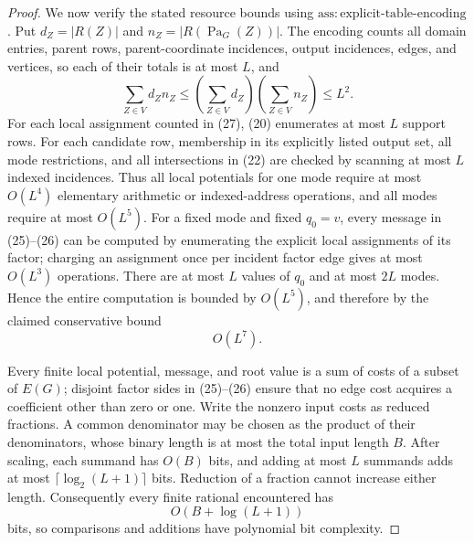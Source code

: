 \documentclass{article}
\begin{document}
\begin{proof}
We now verify the stated resource bounds using \(\mathrm{ass:explicit\mbox{-}table\mbox{-}encoding}\).  Put \(d_Z=|R(Z)|\) and \(n_Z=|R(\operatorname{Pa}_G(Z))|\).  The encoding counts all domain entries, parent rows, parent-coordinate incidences, output incidences, edges, and vertices, so each of their totals is at most \(L\), and
\[
 \sum_{Z\in V}d_Zn_Z
 \le \left(\sum_{Z\in V}d_Z\right)
      \left(\sum_{Z\in V}n_Z\right)
 \le L^2.                                                             \tag{27}
\]
For each local assignment counted in (27), (20) enumerates at most \(L\) support rows.  For each candidate row, membership in its explicitly listed output set, all mode restrictions, and all intersections in (22) are checked by scanning at most \(L\) indexed incidences.  Thus all local potentials for one mode require at most \(O(L^4)\) elementary arithmetic or indexed-address operations, and all modes require at most \(O(L^5)\).  For a fixed mode and fixed \(q_0=v\), every message in (25)--(26) can be computed by enumerating the explicit local assignments of its factor; charging an assignment once per incident factor edge gives at most \(O(L^3)\) operations.  There are at most \(L\) values of \(q_0\) and at most \(2L\) modes.  Hence the entire computation is bounded by \(O(L^5)\), and therefore by the claimed conservative bound
\[
 O(L^7).                                                              \tag{28}
\]

Every finite local potential, message, and root value is a sum of costs of a subset of \(E(G)\); disjoint factor sides in (25)--(26) ensure that no edge cost acquires a coefficient other than zero or one.  Write the nonzero input costs as reduced fractions.  A common denominator may be chosen as the product of their denominators, whose binary length is at most the total input length \(B\).  After scaling, each summand has \(O(B)\) bits, and adding at most \(L\) summands adds at most \(\lceil\log_2(L+1)\rceil\) bits.  Reduction of a fraction cannot increase either length.  Consequently every finite rational encountered has
\[
 O(B+\log(L+1))                                                       \tag{29}
\]
bits, so comparisons and additions have polynomial bit complexity.


\end{proof}
\end{document}
